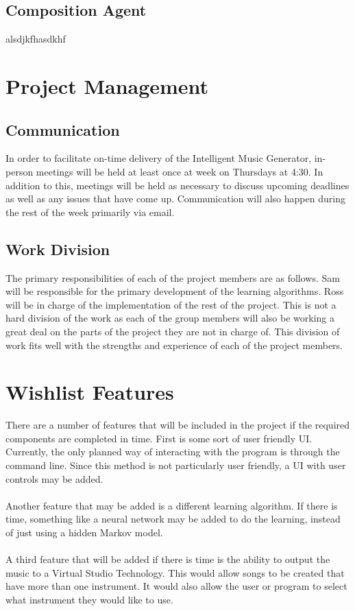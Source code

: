 \documentclass{article}
\begin{document}
\subsection{Composition Agent}
alsdjkfhasdkhf

\section{Project Management}
\subsection{Communication}
In order to facilitate on-time delivery of the Intelligent Music Generator, in-person meetings will be held at least once at week on Thursdays at 4:30. In addition to this, meetings will be held as necessary to discuss upcoming deadlines as well as any issues that have come up. Communication will also happen during the rest of the week primarily via email.

\subsection{Work Division}
The primary responsibilities of each of the project members are as follows. Sam will be responsible for the primary development of the learning algorithms. Ross will be in charge of the implementation of the rest of the project. This is not a hard division of the work as each of the group members will also be working a great deal on the parts of the project they are not in charge of. This division of work fits well with the strengths and experience of each of the project members.


\section{Wishlist Features}
There are a number of features that will be included in the project if the required components are completed in time. First is some sort of user friendly UI. Currently, the only planned way of interacting with the program is through the command line. Since this method is not particularly user friendly, a UI with user controls may be added.\\
\\
Another feature that may be added is a different learning algorithm. If there is time, something like a neural network may be added to do the learning, instead of just using a hidden Markov model.\\
\\
A third feature that will be added if there is time is the ability to output the music to a Virtual Studio Technology. This would allow songs to be created that have more than one instrument. It would also allow the user or program to select what instrument they would like to use.

\nocite{*}



\end{document}
